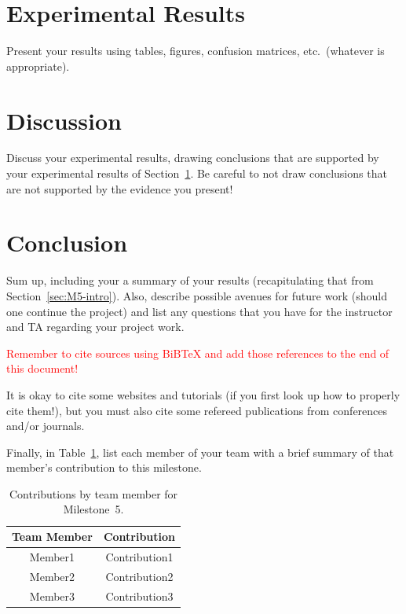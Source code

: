 \documentclass{report}
\begin{document}
\section{Experimental Results}
\label{sec:M5-results}

Present your results  using tables, figures, confusion matrices, etc.\ (whatever is appropriate). 

\section{Discussion}

Discuss your experimental results, drawing conclusions that are supported by your experimental results of Section~\ref{sec:M5-results}.   Be careful to not draw conclusions that are not supported by the evidence you present!

\section{Conclusion}

Sum up, including your a summary of your results  (recapitulating that from Section~\ref{sec:M5-intro}).  Also, describe possible avenues for future work (should one continue the project) and list any questions that you have for the instructor and TA regarding your project work.

\textcolor{red}{Remember to cite sources using BiBTeX and add those references to the end of this document!}

It is okay to cite some websites and tutorials (if you first look up how to properly cite them!), but you must also cite some refereed publications from conferences and/or journals.

Finally, in Table~\ref{tab:contribution5}, list each member of your team with a brief summary of that member's contribution to this milestone.

\begin{table}[]
    \caption{Contributions by team member for Milestone~5.}
    \centering
    \begin{tabular}{|c|c|} \hline
    {\bf Team Member}     &  {\bf Contribution}  \\ \hline
    Member1     &  Contribution1 \\
    Member2     &  Contribution2 \\
    Member3     &  Contribution3 \\ \hline
    \end{tabular}
    \label{tab:contribution5}
\end{table}
\end{document}
